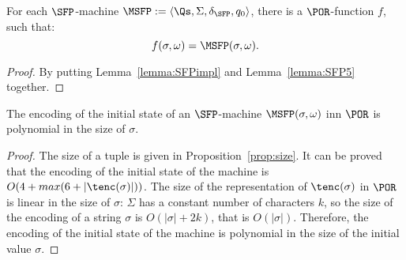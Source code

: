 \begin{prop}\label{SFPprop1}
For each $\SFP$-machine $\MSFP
:= \langle \Qs,\Sigma,\delta_\SFP,q_0\rangle$,
there is a $\POR$-function $f$,
such that:
$$
f(\sigma,\omega) = \MSFP(\sigma,\omega).
$$
\end{prop}
\begin{proof}
By putting Lemma~\ref{lemma:SFPimpl} and
Lemma~\ref{lemma:SFP5}
together.
\end{proof}






\begin{lemma}
The encoding of the initial state
of an $\SFP$-machine
{$\MSFP(\sigma,\omega)$}
inn $\POR$
is polynomial in the size of $\sigma$.
\end{lemma}

\begin{proof}
The size of a tuple is given in
Proposition~\ref{prop:size}. It
can be proved that
the encoding of the initial state
of the machine is $O(4+max(6+|\tenc(\sigma)|))$.
The size of the representation of $\tenc(\sigma)$
in $\POR$ is linear in the size of $\sigma$:
$\Sigma$ has a constant number of characters
$k$, so the size of the encoding of a string
$\sigma$ is $O(|\sigma|+2k)$,
that is $O(|\sigma|)$.
Therefore, the encoding of the
initial state of the machine is polynomial
in the size of the initial value $\sigma$.
\end{proof}




